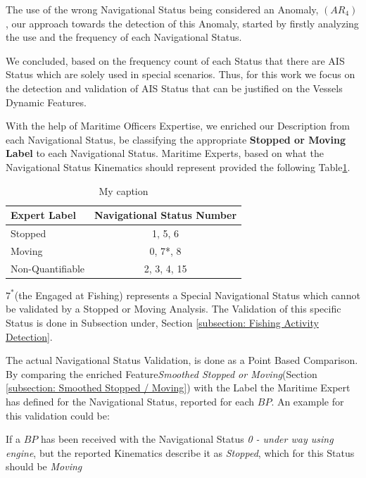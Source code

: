 The use of the wrong Navigational Status being considered an Anomaly, $(AR_4)$, our approach towards the detection of this Anomaly, started by firstly analyzing the use and the frequency of each Navigational Status. 

We concluded, based on the frequency count of each Status that there are AIS Status which are solely used in special scenarios. Thus, for this work we focus on the detection and validation of AIS Status that can be justified on the Vessels Dynamic Features.


With the help of Maritime Officers Expertise, we enriched our Description from each Navigational Status, be classifying the appropriate \textbf{Stopped or Moving Label} to each Navigational Status. Maritime Experts, based on what the Navigational Status Kinematics should represent provided the following
Table\ref{Table: AIS Status Moving or Stopped}.

\begin{table}[H]
\centering
\caption{My caption}
\label{Table: AIS Status Moving or Stopped}
\begin{tabular}{lc}
\hline
Expert Label     & Navigational Status Number \\ \hline
Stopped          & 1, 5, 6                    \\
Moving           & 0, 7*, 8                   \\
Non-Quantifiable & 2, 3, 4, 15                \\ \hline
\end{tabular}
\end{table}
$7^*$(the Engaged at Fishing) represents a Special Navigational Status which cannot be validated by a Stopped or Moving Analysis. The Validation of this specific Status is done in Subsection under, Section \ref{subsection: Fishing Activity Detection}.

The actual Navigational Status Validation, is done as a Point Based Comparison. By comparing the enriched Feature\textit{Smoothed Stopped or Moving}(Section \ref{subsection: Smoothed Stopped / Moving}) with the Label the Maritime Expert has defined for the Navigational Status, reported for each $BP$.
An example for this validation could be:

If a $BP$ has been received with the Navigational Status \textit{0 - under way using engine}, but the 
reported Kinematics describe it as \textit{Stopped}, which for this Status should be \textit{Moving}  

